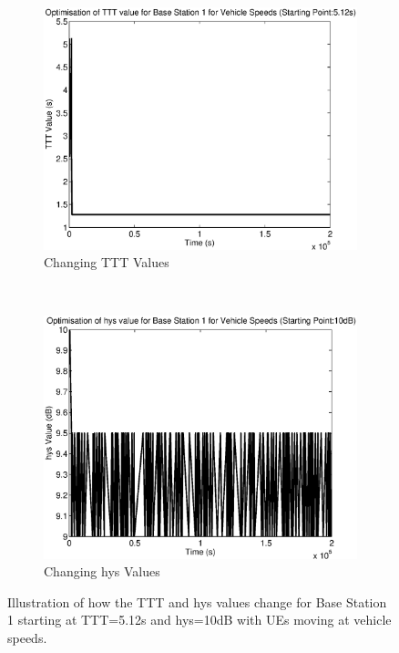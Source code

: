 \begin{figure}[H]
        \centering
        \begin{subfigure}[b]{0.49\textwidth}
                \includegraphics[width=\textwidth]{figures/graphs/vehhigh/TTT1.eps}
                \caption{Changing TTT Values}
        \end{subfigure}%
        ~ %
        \begin{subfigure}[b]{0.49\textwidth}
                \includegraphics[width=\textwidth]{figures/graphs/vehhigh/hys1.eps}
                \caption{Changing hys Values}
        \end{subfigure}
        \caption{Illustration of how the TTT and hys values change for Base Station 1 starting at TTT=5.12s and hys=10dB with UEs moving at vehicle speeds.}
\end{figure}
